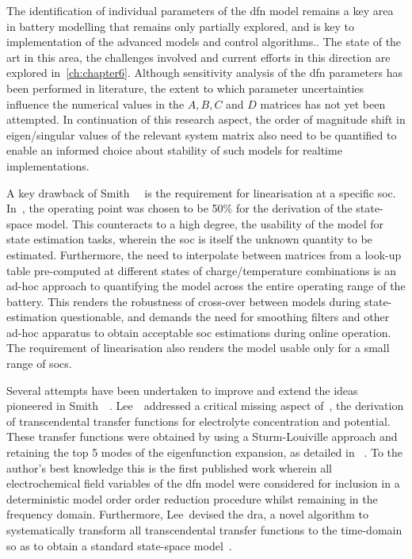 The identification of individual parameters of the \gls{dfn} model remains a key area in battery modelling that remains
only partially explored, and is key to implementation of the advanced models and control algorithms.. The state of the art in this area, the challenges involved and current efforts in
this direction are explored in~\cref{ch:chapter6}. Although sensitivity analysis of the \gls{dfn} parameters has been
performed in literature,  the extent to which parameter uncertainties influence the numerical values
in the $A, B, C$ and $D$ matrices has not yet been attempted. In continuation of this research aspect, the order of
magnitude shift in eigen/singular values of the relevant system matrix also need to be quantified to enable an informed
choice about stability of such models for realtime implementations.

A key drawback of Smith~\etal{}~\cite{Smith2007} is the requirement for linearisation at a specific \gls{soc}.
In~\cite{Smith2007}, the operating point was chosen to be 50\% for the derivation of the state-space model. This
counteracts to a high degree, the usability of the model for state estimation tasks, wherein the \gls{soc} is itself the
unknown quantity to be estimated. Furthermore, the need to interpolate between matrices from a look-up table
pre-computed at different states of charge/temperature combinations is an ad-hoc approach to quantifying the model
across the entire operating range of the battery. This renders the robustness of cross-over between models during
state-estimation questionable, and demands the need for smoothing filters and other ad-hoc apparatus to obtain
acceptable \gls{soc} estimations during online operation. The requirement of linearisation also renders the model usable
only for a small range of \gls{soc}s.

Several attempts have been undertaken to improve and extend the ideas pioneered in Smith~\etal{}~\cite{Smith2007}.
Lee~\etal{}~addressed a critical missing aspect of~\cite{Smith2007}, \viz the derivation of transcendental transfer
functions for electrolyte concentration and potential. These transfer functions were obtained by using a Sturm-Louiville
approach and retaining the top 5 modes of the eigenfunction expansion, as detailed in~\cite{Lee2012} . To the author's
best knowledge this is the first published work wherein all electrochemical field variables of the \gls{dfn} model were
considered for inclusion in a deterministic model order order reduction procedure whilst remaining in the frequency
domain. Furthermore, Lee~\etal devised the \gls{dra}, a novel algorithm to systematically transform all transcendental
transfer functions to the time-domain so as to obtain a standard state-space model~\cite{Lee2012a}.

